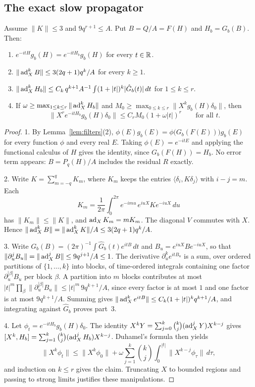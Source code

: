 \subsection{The exact slow propagator}

\begin{proposition}\label{prop:slow}
Assume $\|K\|\le3$ and $9q^{r+1}\le A$. Put $B=Q/A=F(H)$ and $H_b=G_b(B)$. Then:
\begin{enumerate}
\item $e^{-itH}g_b(H)=e^{-itH_b}g_b(H)$ for every $t\in\mathbb R$.
\item $\|\operatorname{ad}_X^kB\|\le3(2q+1)q^k/A$ for every $k\ge1$.
\item $\|\operatorname{ad}_X^kH_b\|\le C_k\,q^{k+1}A^{-1}\int(1+|t|)^k|\hat G_b(t)|\,dt$ for $1\le k\le r$.
\item If $\omega\ge\max_{1\le k\le r}\|\operatorname{ad}_X^kH_b\|$ and $M_0\ge\max_{0\le k\le r}\|X^kg_b(H)\delta_0\|$, then
\[
\|X^re^{-itH_b}g_b(H)\delta_0\|\le C_rM_0(1+\omega|t|)^r\qquad\text{for all }t.
\]
\end{enumerate}
\end{proposition}

\begin{proof}
1. By Lemma~\ref{lem:filters}(2), $\phi(E)g_b(E)=\phi\bigl(G_b(F(E))\bigr)g_b(E)$ for every function $\phi$ and every real $E$. Taking $\phi(E)=e^{-itE}$ and applying the functional calculus of $H$ gives the identity, since $G_b(F(H))=H_b$. No error term appears: $B=P_q(H)/A$ includes the residual $R$ exactly.

2. Write $K=\sum_{m=-q}^qK_m$, where $K_m$ keeps the entries $\langle\delta_i,K\delta_j\rangle$ with $i-j=m$. Each
\[
K_m=\frac1{2\pi}\int_0^{2\pi}e^{-imu}\,e^{iuX}Ke^{-iuX}\,du
\]
has $\|K_m\|\le\|K\|$, and $\operatorname{ad}_XK_m=mK_m$. The diagonal $V$ commutes with $X$. Hence $\|\operatorname{ad}_X^kB\|=\|\operatorname{ad}_X^kK\|/A\le3(2q+1)q^k/A$.

3. Write $G_b(B)=(2\pi)^{-1}\int\hat G_b(t)e^{itB}\,dt$ and $B_u=e^{iuX}Be^{-iuX}$, so that $\|\partial_u^jB_u\|=\|\operatorname{ad}_X^jB\|\le9q^{j+1}/A\le1$. The derivative $\partial_u^ke^{itB_u}$ is a sum, over ordered partitions of $\{1,\dots,k\}$ into blocks, of time-ordered integrals containing one factor $\partial_u^{|\beta|}B_u$ per block $\beta$. A partition into $m$ blocks contributes at most $|t|^m\prod_\beta\|\partial_u^{|\beta|}B_u\|\le|t|^m\,9q^{k+1}/A$, since every factor is at most $1$ and one factor is at most $9q^{k+1}/A$. Summing gives $\|\operatorname{ad}_X^ke^{itB}\|\le C_k(1+|t|)^kq^{k+1}/A$, and integrating against $\hat G_b$ proves part~3.

4. Let $\phi_t=e^{-itH_b}g_b(H)\delta_0$. The identity $X^kY=\sum_{j=0}^k\binom kj(\operatorname{ad}_X^jY)X^{k-j}$ gives $[X^k,H_b]=\sum_{j=1}^k\binom kj(\operatorname{ad}_X^jH_b)X^{k-j}$. Duhamel's formula then yields
\[
\|X^k\phi_t\|\le\|X^k\phi_0\|+\omega\sum_{j=1}^k\binom kj\int_0^{|t|}\|X^{k-j}\phi_\tau\|\,d\tau,
\]
and induction on $k\le r$ gives the claim. Truncating $X$ to bounded regions and passing to strong limits justifies these manipulations.
\end{proof}

